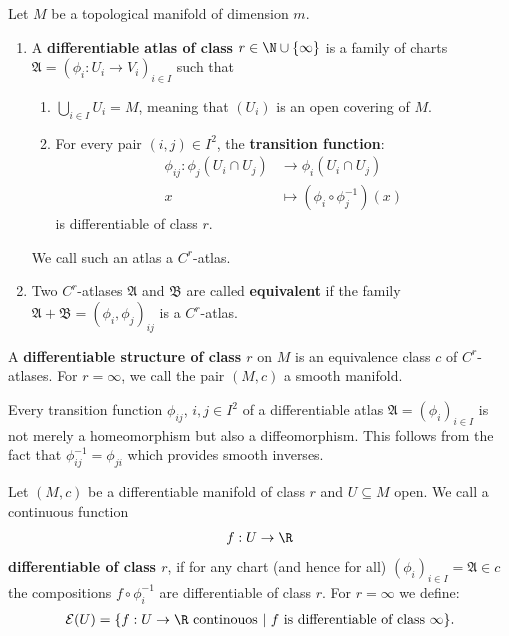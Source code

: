 \begin{definition} \label{def:vb-differentiableManifold}
	Let $M$ be a topological manifold of dimension $m$. 
	\begin{enumerate}
		\item A \textbf{differentiable atlas of class} $r\in \N\cup\{\infty\}$ is a family of charts $\mathfrak{A}=\left( \phi_i:U_i \to V_i\right)_{i\in I}$ such that
		\begin{enumerate}
			\item $\bigcup_{i\in I}U_i=M$, meaning that $\left( U_i\right)$ is an open covering of $M$.
			\item For every pair $(i,j)\in I^2$, the \textbf{transition function}:
			\begin{align*}
				\phi_{ij}:\phi_j(U_i \cap U_j)&\to \phi_i(U_i \cap U_j)\\
				x                             &\mapsto \left(\phi_i \circ \phi_j^{-1}\right)(x)
			\end{align*}
			is differentiable of class $r$.
		\end{enumerate}
		We call such an atlas a $C^r$-atlas.
		\item Two $C^r$-atlases $\mathfrak{A}$ and $\mathfrak{B}$ are called \textbf{equivalent} if the family $\mathfrak{A}+\mathfrak{B}=\left(\phi_i,\phi_j\right)_{ij}$ is a $C^r$-atlas.
	\end{enumerate}
	A \textbf{differentiable structure of class $r$} on $M$ is an equivalence class $c$ of $C^r$-atlases. 
	For $r=\infty$, we call the pair $(M,c)$ a smooth manifold.
\end{definition}


\begin{corollary}
	Every transition function $\phi_{ij}$, $i,j\in I^2$ of a differentiable atlas $\mathfrak{A}=(\phi_i)_{i\in I}$ is not merely a homeomorphism but also a diffeomorphism. This follows from the fact that $\phi_{ij}^{-1}=\phi_{ji}$ which provides smooth inverses.
\end{corollary}

\begin{definition} \label{def:vb-smoothFunctions}
	Let $(M,c)$ be a differentiable manifold of class $r$ and $U\subseteq M$ open. We call a continuous function 
	\begin{align*}
		f:U \to \R
	\end{align*} \textbf{differentiable of class $r$}, if for any chart (and hence for all) $(\phi_i)_{i\in I}=\mathfrak{A}\in c$ the compositions $f\circ \phi_i^{-1}$ are differentiable of class $r$. For $r=\infty$ we define:
	\begin{align*}
		\mathcal{E}(U)=\{f :  U \to \R \text{ continouos}~|~ f \text{ is differentiable of class }\infty \} . 
	\end{align*}
\end{definition} 



